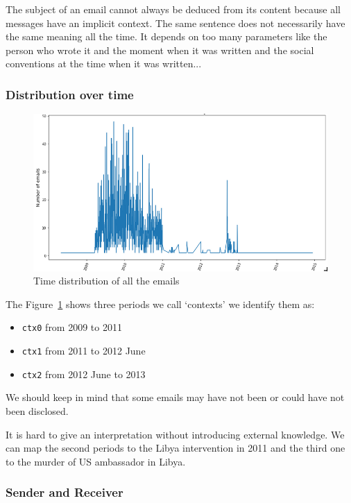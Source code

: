 \documentclass[11pt]{article}
\begin{document}
The subject of an email cannot always be deduced from its content because all messages have an implicit context. The same sentence does not necessarily have the same meaning all the time. It depends on too many parameters like the person who wrote it and the moment when it was written and the social conventions at the time when it was written...

\subsubsection{Distribution over time}

\begin{figure}[h]
	\centering
	\includegraphics[width=\linewidth]{images/emails_distribution.png}
	\caption{Time distribution of all the emails}
	\label{fig:emails_time_distribution}
\end{figure}

The Figure~\ref{fig:emails_time_distribution} shows three periods we call `contexts' we identify them as:

\begin{itemize}
    \item \texttt{ctx0} from 2009 to 2011
    \item \texttt{ctx1} from 2011 to 2012 June
    \item \texttt{ctx2} from 2012 June to 2013
\end{itemize}

We should keep in mind that some emails may have not been or could have not been disclosed.

It is hard to give an interpretation without introducing external knowledge. We can map the second periods to the Libya intervention in 2011 and the third one to the murder of US ambassador in Libya.

\subsubsection{Sender and Receiver}
\end{document}
